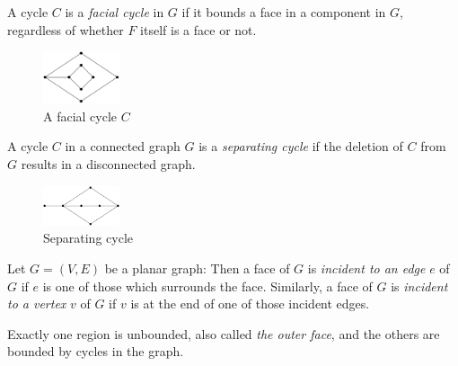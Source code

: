 \begin{definition}
A cycle $C$ is a \textit{facial cycle} in $G$ if it bounds a face in a component in $G$, regardless of whether $F$ itself is a face or not. \cite{dvorak2013threecoloring}
\begin{figure}[H] %
\centering %
\includegraphics[width=0.2\textwidth]{figure/facialcycle.png} 
\caption{A facial cycle $C$} %
\label{figure} %
\end{figure}
\end{definition}

\begin{definition}
A cycle $C$ in a connected graph $G$ is a \textit{separating cycle} if the deletion of $C$ from $G$ results in a disconnected graph. \cite{THOMASSEN197857}
\begin{figure}[H] %
\centering %
\includegraphics[width=0.2\textwidth]{figure/separating cycle.png} 
\caption{Separating cycle} %
\label{figure} %
\end{figure}
\end{definition}

\begin{definition}
Let $G = (V, E)$ be a planar graph: Then a face of $G$ is \textit{incident to an edge} $e$ of $G$ if $e$ is one of those which surrounds the face. Similarly, a face of $G$ is \textit{incident to a vertex} $v$ of $G$ if $v$ is at the end of one of those incident edges. \cite{Incident}
\end{definition}

\begin{definition}
Exactly one region is unbounded, also called \textit{the outer face}, and the others are bounded by cycles in the graph. \cite{Theorem}
\end{definition}

